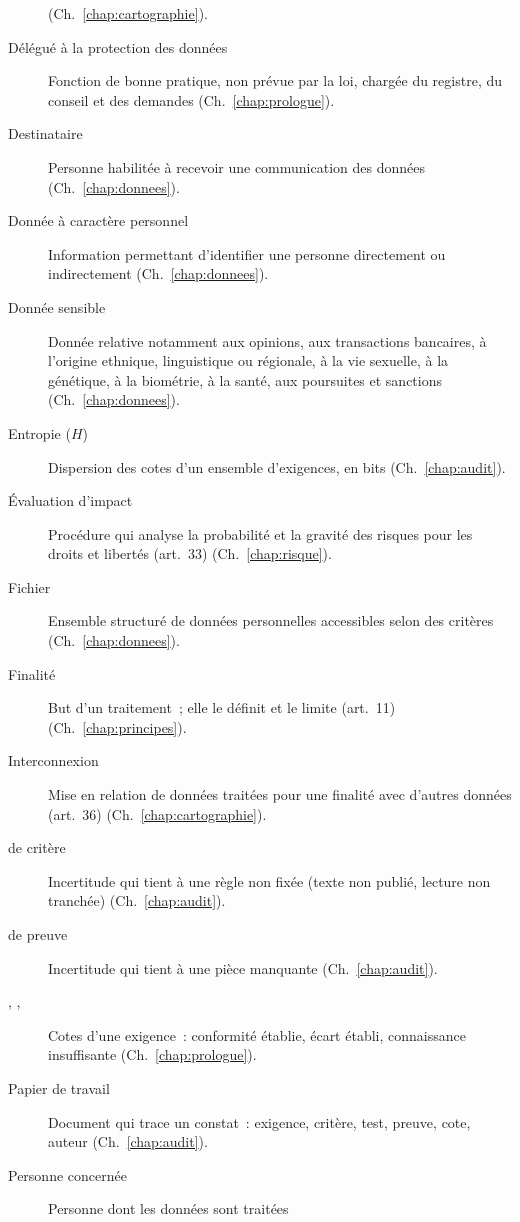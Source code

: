 \begin{description}
          (Ch.~\ref{chap:cartographie}).
    \item[Délégué à la protection des données] Fonction de bonne pratique,
          non prévue par la loi, chargée du registre, du conseil et des
          demandes (Ch.~\ref{chap:prologue}).
    \item[Destinataire] Personne habilitée à recevoir une communication des
          données (Ch.~\ref{chap:donnees}).
    \item[Donnée à caractère personnel] Information permettant d'identifier
          une personne directement ou indirectement (Ch.~\ref{chap:donnees}).
    \item[Donnée sensible] Donnée relative notamment aux opinions, aux
          transactions bancaires, à l'origine ethnique, linguistique ou
          régionale, à la vie sexuelle, à la génétique, à la biométrie, à la
          santé, aux poursuites et sanctions (Ch.~\ref{chap:donnees}).
    \item[Entropie ($H$)] Dispersion des cotes d'un ensemble d'exigences, en
          bits (Ch.~\ref{chap:audit}).
    \item[Évaluation d'impact] Procédure qui analyse la probabilité et la
          gravité des risques pour les droits et libertés (art.~33)
          (Ch.~\ref{chap:risque}).
    \item[Fichier] Ensemble structuré de données personnelles accessibles
          selon des critères (Ch.~\ref{chap:donnees}).
    \item[Finalité] But d'un traitement~; elle le définit et le limite
          (art.~11) (Ch.~\ref{chap:principes}).
    \item[Interconnexion] Mise en relation de données traitées pour une
          finalité avec d'autres données (art.~36)
          (Ch.~\ref{chap:cartographie}).
    \item[\NEK{} de critère] Incertitude qui tient à une règle non fixée
          (texte non publié, lecture non tranchée) (Ch.~\ref{chap:audit}).
    \item[\NEK{} de preuve] Incertitude qui tient à une pièce manquante
          (Ch.~\ref{chap:audit}).
    \item[\OUI{}, \NON{}, \NEK{}] Cotes d'une exigence~: conformité établie,
          écart établi, connaissance insuffisante (Ch.~\ref{chap:prologue}).
    \item[Papier de travail] Document qui trace un constat~: exigence,
          critère, test, preuve, cote, auteur (Ch.~\ref{chap:audit}).
    \item[Personne concernée] Personne dont les données sont traitées

\end{description}
